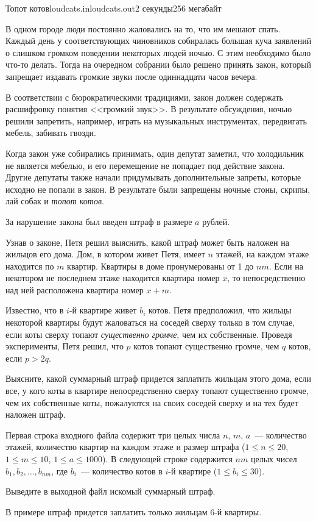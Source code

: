 \begin{problem}{Топот котов}{loudcats.in}{loudcats.out}{2 секунды}{256 мегабайт}


В одном городе люди постоянно жаловались на то, что им мешают спать. Каждый день у 
соответствующих чиновников собиралась большая куча заявлений о слишком громком 
поведении некоторых людей ночью. С этим необходимо было что-то делать. Тогда на
очередном собрании было решено принять закон, который запрещает издавать громкие
звуки после одиннадцати часов вечера. 

В соответствии с бюрократическими традициями, закон должен содержать расшифровку
понятия <<громкий звук>>. В результате обсуждения, ночью решили запретить, 
например, играть на музыкальных инструментах, передвигать мебель, забивать гвозди.

Когда закон уже собирались принимать, один депутат заметил, что холодильник не 
является мебелью, и его перемещение не попадает под действие закона. Другие депутаты 
также начали придумывать дополнительные запреты, которые исходно не попали в закон. 
В результате были запрещены ночные стоны, скрипы, лай собак и \emph{топот котов}.

За нарушение закона был введен штраф в размере $a$ рублей. 

Узнав о законе, Петя решил выяснить, какой штраф может быть наложен
на жильцов его дома. Дом, в котором живет Петя, имеет $n$ этажей, 
на каждом этаже находится по $m$ квартир. Квартиры в доме пронумерованы от 1 до $nm$. 
Если на некотором не последнем этаже находится квартира номер $x$, то 
непосредственно над ней расположена квартира номер $x + m$. 

Известно, что в $i$-й квартире живет $b_i$ котов.
Петя предположил, что жильцы некоторой квартиры будут жаловаться на соседей
сверху только в том случае, если коты сверху топают \emph{существенно громче}, 
чем их собственные. Проведя эксперименты, Петя решил, что $p$ котов
топают существенно громче, чем $q$ котов, если $p > 2q$.

Выясните, какой суммарный штраф придется заплатить жильцам этого дома,
если все, у кого коты в квартире непосредственно сверху топают существенно
громче, чем их собственные коты, пожалуются на своих соседей сверху
и на тех будет наложен штраф.

\InputFile
Первая строка входного файла содержит три целых числа 
$n$, $m$, $a$~--- количество этажей, количество
квартир на каждом этаже и размер штрафа ($1 \le n \le 20$, 
$1 \le m \le 10$, $1 \le a \le 1000$). 
В следующей строке содержится $nm$ целых чисел $b_1, b_2, \ldots, b_{nm}$, 
где $b_i$~--- количество котов 
в $i$-й квартире ($1 \le b_i \le 30$). 

\OutputFile
Выведите в выходной файл искомый суммарный штраф.

\Example
\begin{example}%
%
\end{example}

\Note
В примере штраф придется заплатить только жильцам 6-й квартиры.

\end{problem}
